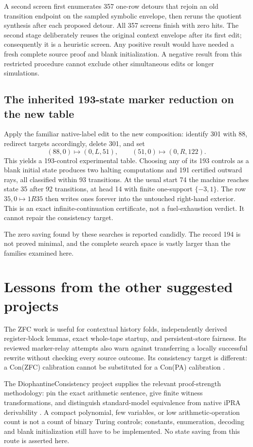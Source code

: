 \documentclass[11pt,letterpaper]{article}
\theoremstyle{definition}\newtheorem{definition}[theorem]{Definition}
\theoremstyle{remark}\newtheorem{remark}[theorem]{Remark}
\begin{document}
A second screen first enumerates 357 one-row detours that rejoin an old
transition endpoint on the sampled symbolic envelope, then reruns the
quotient synthesis after each proposed detour. All 357 screens finish
with zero hits. The second stage deliberately reuses the original context
envelope after its first edit; consequently it is a heuristic screen.
Any positive result would have needed a fresh complete source proof and
blank initialization. A negative result from this restricted procedure
cannot exclude other simultaneous edits or longer simulations.

\subsection{The inherited 193-state marker reduction on the new table}

Apply the familiar native-label edit to the new composition:
identify 301 with 88, redirect targets accordingly, delete 301, and set
\[
 (88,0)\mapsto(0,L,51),\qquad(51,0)\mapsto(0,R,122).
\]
This yields a 193-control experimental table. Choosing any of its 193
controls as a blank initial state produces two halting computations and
191 certified outward rays, all classified within 93 transitions. At the
usual start 74 the machine reaches state 35 after 92 transitions, at head
14 with finite one-support $\{-3,1\}$. The row $35,0\mapsto1R35$ then
writes ones forever into the untouched right-hand exterior. This is an
exact infinite-continuation certificate, not a fuel-exhaustion verdict.
It cannot repair the consistency target.

The zero saving found by these searches is reported candidly. The record
194 is not proved minimal, and the complete search space is vastly larger
than the families examined here.

\section{Lessons from the other suggested projects}

The ZFC work is useful for contextual history folds, independently derived
register-block lemmas, exact whole-tape startup, and persistent-store
fairness. Its reviewed marker-relay attempts also warn against transferring
a locally successful rewrite without checking every source outcome.
Its consistency target is different: a Con(ZFC) calibration cannot be
substituted for a Con(PA) calibration \cite{zfc}.

The DiophantineConsistency project supplies the relevant proof-strength
methodology: pin the exact arithmetic sentence, give finite witness
transformations, and distinguish standard-model equivalence from native
iPRA derivability \cite{dio}. A compact polynomial, few variables, or low
arithmetic-operation count is not a count of binary Turing controls;
constants, enumeration, decoding and blank initialization still have to
be implemented. No state saving from this route is asserted here.
\end{document}
